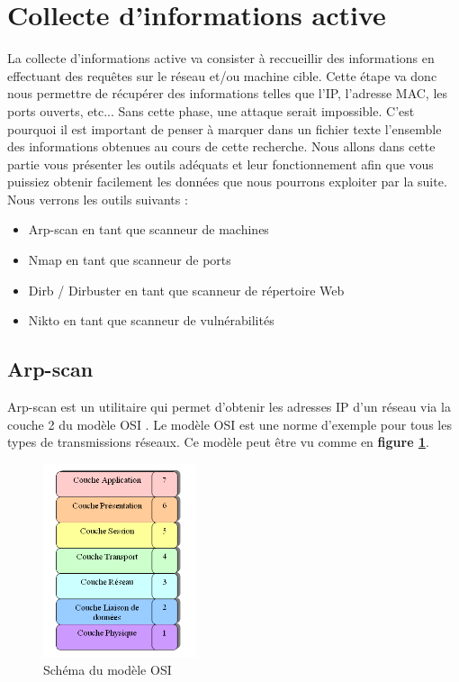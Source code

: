 \newpage
\section{Collecte d'informations active}

La collecte d'informations active va consister à reccueillir des informations en effectuant des requêtes sur le réseau et/ou machine cible. Cette étape va donc nous permettre de récupérer des informations telles que l'IP, l'adresse MAC, les ports ouverts, etc... Sans cette phase, une attaque serait impossible. C'est pourquoi il est important de penser à marquer dans un fichier texte l'ensemble des informations obtenues au cours de cette recherche. Nous allons dans cette partie vous présenter les outils adéquats et leur fonctionnement afin que vous puissiez obtenir facilement les données que nous pourrons exploiter par la suite. Nous verrons les outils suivants :

\begin{itemize}
    \item Arp-scan en tant que scanneur de machines
    \item Nmap en tant que scanneur de ports
    \item Dirb / Dirbuster en tant que scanneur de répertoire Web
    \item Nikto en tant que scanneur de vulnérabilités
\end{itemize}

\subsection{Arp-scan}

Arp-scan est un utilitaire qui permet  d’obtenir les adresses IP d’un réseau via la couche 2 du modèle OSI . Le modèle OSI est une norme d’exemple pour tous les types de transmissions réseaux. Ce modèle peut être vu comme en \textbf{figure \ref{fig:osi}}.
\begin{figure}[htp!]
  \centering
  \setlength\figureheight{7cm}
  \setlength\figurewidth{9cm}
  \includegraphics[width=0.4\textwidth]{oui/images/Arpscan/modeleOSI.PNG}
  \caption{Schéma du modèle OSI}
  \label{fig:osi}
\end{figure}

